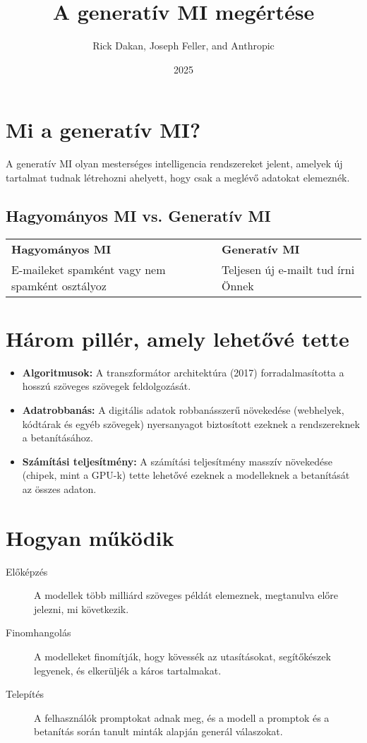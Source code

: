 \documentclass[a4paper, 11pt]{article}
\makeatletter
\renewcommand{\maketitle}{
  \begin{center}
    {\fontsize{22}{26}\bfseries\color{primary}\@title}
    \vspace{0.5em}
    {\color{lightgray}\titlerule[3pt]}
    \vspace{1.5em}
  \end{center}
}
\makeatother
\begin{document}
\title{A generatív MI megértése}
\author{Rick Dakan, Joseph Feller, and Anthropic}
\date{2025}
\maketitle

\section*{Mi a generatív MI?}
A generatív MI olyan mesterséges intelligencia rendszereket jelent, amelyek új tartalmat tudnak létrehozni ahelyett, hogy csak a meglévő adatokat elemeznék.

\subsection*{Hagyományos MI vs. Generatív MI}
\begin{tabular}{ll}
\textbf{Hagyományos MI} & \textbf{Generatív MI} \\
E-maileket spamként vagy nem spamként osztályoz & Teljesen új e-mailt tud írni Önnek \\
\end{tabular}

\section*{Három pillér, amely lehetővé tette}
\begin{itemize}
    \item \textbf{Algoritmusok:} A transzformátor architektúra (2017) forradalmasította a hosszú szöveges szövegek feldolgozását.
    \item \textbf{Adatrobbanás:} A digitális adatok robbanásszerű növekedése (webhelyek, kódtárak és egyéb szövegek) nyersanyagot biztosított ezeknek a rendszereknek a betanításához.
    \item \textbf{Számítási teljesítmény:} A számítási teljesítmény masszív növekedése (chipek, mint a GPU-k) tette lehetővé ezeknek a modelleknek a betanítását az összes adaton.
\end{itemize}

\section*{Hogyan működik}
\begin{description}
    \item[Előképzés] A modellek több milliárd szöveges példát elemeznek, megtanulva előre jelezni, mi következik.
    \item[Finomhangolás] A modelleket finomítják, hogy kövessék az utasításokat, segítőkészek legyenek, és elkerüljék a káros tartalmakat.
    \item[Telepítés] A felhasználók promptokat adnak meg, és a modell a promptok és a betanítás során tanult minták alapján generál válaszokat.
\end{description}
\end{document}
